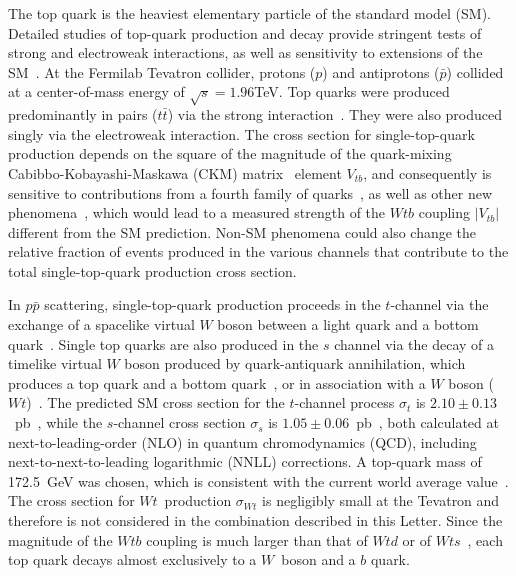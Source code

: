 \documentclass[aps,prl,twocolumn,showpacs,superscriptaddress,groupedaddress]{revtex4}  %
\newcommand{\ttbar}     {\mbox{$t\bar{t}$}\xspace}
\newcommand{\Wt}{\ensuremath{\mathit{\!Wt}}\xspace}
\begin{document}
The top quark is the heaviest elementary particle of the standard model
(SM). Detailed studies of top-quark production and decay provide
stringent tests of strong and electroweak interactions, as well as
sensitivity to extensions of the SM~\cite{top}. At the Fermilab
Tevatron collider, protons ($p$) and antiprotons ($\bar{p}$) collided
at a center-of-mass energy of $\sqrt{s}=1.96$\;TeV. Top quarks were
produced predominantly in pairs (\ttbar) via the strong
interaction~\cite{ttbar_combi}.  They were also produced singly via
the electroweak interaction. The cross section for single-top-quark
production depends on the square of the magnitude of the quark-mixing 
Cabibbo-Kobayashi-Maskawa (CKM) matrix~\cite{ckm} element $V_{tb}$,
and consequently is sensitive to contributions from a fourth 
family of quarks~\cite{FourthGen1,FourthGen2}, as well as other 
new phenomena~\cite{Tait:2000sh}, which would lead to a measured 
strength of the $Wtb$ coupling $|V_{tb}|$ different from the SM
prediction. Non-SM phenomena could also change the relative fraction
of events produced in the various channels that contribute to the
total single-top-quark production cross section.

In $p{\bar p}$ scattering, single-top-quark production proceeds in the
$t$-channel via the exchange of a spacelike virtual $W$ boson between
a light quark and a bottom
quark~\cite{singletop-willenbrock,singletop-yuan,tchannel-kidonakis}.
Single top quarks are also produced in the $s$ channel via the decay
of a timelike virtual $W$ boson 
produced by quark-antiquark annihilation, which produces a top quark
and a bottom quark~\cite{singletop-cortese}, or in association with a
$W$ boson (\Wt)~\cite{Wt-tait}.  The predicted SM cross section for
the $t$-channel process $\sigma_t$ is $2.10 \pm
0.13$~pb~\cite{tchannel-kidonakis}, while the $s$-channel cross
section $\sigma_s$ is $1.05 \pm 0.06$~pb~\cite{schannel-kidonakis},
both calculated at next-to-leading-order (NLO) in quantum
chromodynamics (QCD), including next-to-next-to-leading logarithmic (NNLL)
corrections. A top-quark mass of 172.5~GeV was chosen, which is
consistent with the 
current world average value~\cite{topmasswa}. The cross section for
\Wt\ production $\sigma_{Wt}$  is negligibly small at the Tevatron and
 therefore is not considered in the combination described in this Letter. 
Since the magnitude of the $Wtb$ coupling is much larger than that of
$Wtd$ or of $Wts$~\cite{pdg}, each top quark decays almost exclusively
to a $W$~boson and a $b$ quark.
\end{document}
